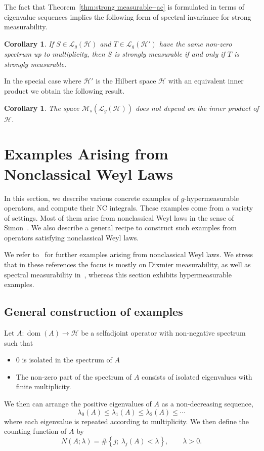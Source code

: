 \documentclass[10pt, a4paper]{amsart}
\newcommand{\sL}{\mathscr{L}}
\newcommand{\sH}{\mathscr{H}}
\newcommand{\sM}{\mathscr{M}}
\newcommand{\op}{\operatorname}
\newcommand{\dom}{\op{dom}}
\numberwithin{equation}{section}
\newtheorem{corollary}[theorem]{Corollary}
\theoremstyle{definition}
\theoremstyle{remark}
\begin{document}
The fact that Theorem~\ref{thm:strong measurable--ac} is formulated in terms of eigenvalue sequences implies the following form of spectral invariance for strong measurability.

\begin{corollary}\label{cor:Strong.spectral-invariance}
If  $S\in \sL_g(\sH)$ and $T\in \sL_g(\sH')$ have the same non-zero spectrum up to multiplicity, then $S$ is strongly measurable if and only if $T$ is strongly measurable. \end{corollary}

In the special case where $\sH'$ is the Hilbert space $\sH$ with an equivalent inner product we obtain the following result.

\begin{corollary}
 The space $\sM_s(\sL_g(\sH))$ does not depend on the inner product of $\sH$.
\end{corollary}

\section{Examples Arising from Nonclassical Weyl Laws}\label{sec:examples}
In this section, we describe various concrete examples of $g$-hypermeasurable operators, and compute their NC integrals. These examples come from a variety of settings. Most of them arise from nonclassical Weyl laws in the sense of Simon~\cite{Si:JFA83}. We also describe a general recipe to construct such examples from operators satisfying nonclassical Weyl laws.

We refer to~\cite{GS:JFA14, GU:JMAA20, LU:JMAA25, PT:Part1, TU:JMAA27} for further examples arising from nonclassical Weyl laws. We stress that in these references the focus is mostly on Dixmier measurability, as well as spectral measurability in~\cite{PT:Part1}, whereas this section exhibits hypermeasurable examples. 

\subsection{General construction of examples}
Let $A:\dom(A)\rightarrow \sH$ be a selfadjoint operator with non-negative spectrum such that
\begin{itemize}
 \item $0$ is isolated in the spectrum of $A$

 \item The non-zero part of the spectrum of $A$ consists of isolated eigenvalues with finite multiplicity.
\end{itemize}
We then can arrange the positive eigenvalues of $A$ as a non-decreasing sequence,
\begin{equation*}
 \lambda_0(A)\leq  \lambda_1(A) \leq \lambda_2(A)\leq \cdots
\end{equation*}
where each eigenvalue is repeated according to multiplicity. We then define the counting function of $A$ by
\begin{equation*}
 N(A;\lambda)=\#\left\{j; \ \lambda_j\left(A\right) <\lambda\right\},  \qquad \lambda>0.
\end{equation*}
\end{document}
